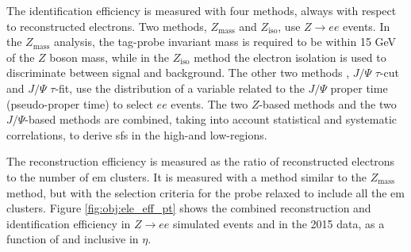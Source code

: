 The identification efficiency is measured with four methods, always with respect to reconstructed electrons. Two methods, $Z_\mathrm{mass}$ and $Z_\mathrm{iso}$, use $Z\rightarrow e e$ events. 
In the $Z_\mathrm{mass}$ analysis, the tag-probe invariant mass is required to be within 15 GeV of the $Z$ boson mass, while in the $Z_\mathrm{iso}$ method the electron isolation is used to discriminate between signal and background. The other two methods \cite{ATLAS:2014wga}, $J/\Psi$ $\tau$-cut and $J/\Psi$ $\tau$-fit, use the distribution of a variable related to the $J/\Psi$ proper time (pseudo-proper time) to select $ee$ events. 
The two $Z$-based methods and the two $J/\Psi$-based methods are combined, taking into account statistical and systematic correlations, to 
derive \glspl{sf} in the high-\et and low-\et regions. 


The reconstruction efficiency is measured as the ratio of reconstructed electrons to the number of \gls{em} clusters. 
It is measured with a method similar to the $Z_\mathrm{mass}$ method, but with the selection criteria for the probe relaxed to include all the \gls{em} clusters. Figure \ref{fig:obj:ele_eff_pt} shows the combined reconstruction and identification efficiency in $Z\rightarrow e e$ simulated events and in the 2015 data, as a function of \et and inclusive in $\eta$.

